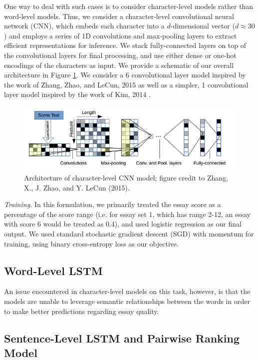 \documentclass[10pt,psamsfonts]{amsart}
\theoremstyle{definition}
\theoremstyle{remark}
\numberwithin{equation}{section}
\begin{document}
One way to deal with such cases is to consider character-level models rather than word-level models. Thus, we consider a character-level convolutional neural network (CNN), which embeds each character into a $d$-dimensional vector ($d \approx 30$) and employs a series of 1D convolutions and max-pooling layers to extract efficient representations for inference. We stack fully-connected layers on top of the convolutional layers for final processing, and use either dense or one-hot encodings of the characters as input. We provide a schematic of our overall architecture in Figure \ref{fig:cnn}. We consider a 6 convolutional layer model inspired by the work of Zhang, Zhao, and LeCun, 2015 \cite{charnn} as well as a simpler, 1 convolutional layer model inspired by the work of Kim, 2014 \cite{kim14}.

\begin{figure}
	\includegraphics[width=\textwidth]{cnn.png}
	\caption{Architecture of character-level CNN model; figure credit to Zhang, X., J. Zhao, and Y. LeCun (2015).}
	\label{fig:cnn}
\end{figure}

{\em Training.} In this formulation, we primarily treated the essay score as a percentage of the score range (i.e. for essay set 1, which has range 2-12, an essay with score 6 would be treated as 0.4), and used logistic regression as our final output. We used standard stochastic gradient descent (SGD) with momentum for training, using binary cross-entropy loss as our objective.

\subsection*{Word-Level LSTM}

An issue encountered in character-level models on this task, however, is that the models are unable to leverage semantic relationships between the words in order to make better predictions regarding essay quality. 

\subsection*{Sentence-Level LSTM and Pairwise Ranking Model}
\end{document}
